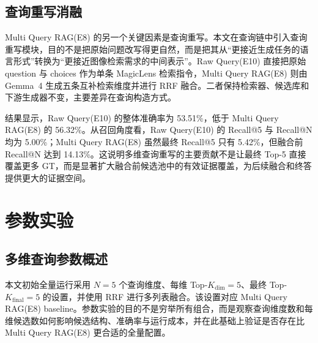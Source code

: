 \subsection{查询重写消融}

Multi Query RAG(E8) 的另一个关键因素是查询重写。本文在查询链中引入查询重写模块，目的不是把原始问题改写得更自然，而是把其从“更接近生成任务的语言形式”转换为“更接近图像检索需求的中间表示”。Raw Query(E10) 直接把原始 question 与 choices 作为单条 MagicLens 检索指令，Multi Query RAG(E8) 则由 Gemma~4 生成五条互补检索维度并进行 RRF 融合。二者保持检索器、候选库和下游生成器不变，主要差异在查询构造方式。

结果显示，Raw Query(E10) 的整体准确率为 53.51\%，低于 Multi Query RAG(E8) 的 56.32\%。从召回角度看，Raw Query(E10) 的 Recall@5 与 Recall@N 均为 5.00\%；Multi Query RAG(E8) 虽然最终 Recall@5 只有 5.42\%，但融合前 Recall@N 达到 14.13\%。这说明多维查询重写的主要贡献不是让最终 Top-5 直接覆盖更多 GT，而是显著扩大融合前候选池中的有效证据覆盖，为后续融合和终答提供更大的证据空间。

\begin{table}[!htb]
\centering
\scriptsize
\caption{查询重写模块消融结果。Raw Query(E10) 直接使用原始问题与选项作为单条检索指令，Multi Query RAG(E8) 使用 Gemma~4 生成五条互补查询并进行 RRF 融合。}
\label{tab:ablation_rewrite}
\end{table}

\section{参数实验}

\subsection{多维查询参数概述}

本文初始全量运行采用 $N=5$ 个查询维度、每维 Top-$K_{\mathrm{dim}}=5$、最终 Top-$K_{\mathrm{final}}=5$ 的设置，并使用 RRF 进行多列表融合。该设置对应 Multi Query RAG(E8) baseline。参数实验的目的不是穷举所有组合，而是观察查询维度数和每维候选数如何影响候选结构、准确率与运行成本，并在此基础上验证是否存在比 Multi Query RAG(E8) 更合适的全量配置。

